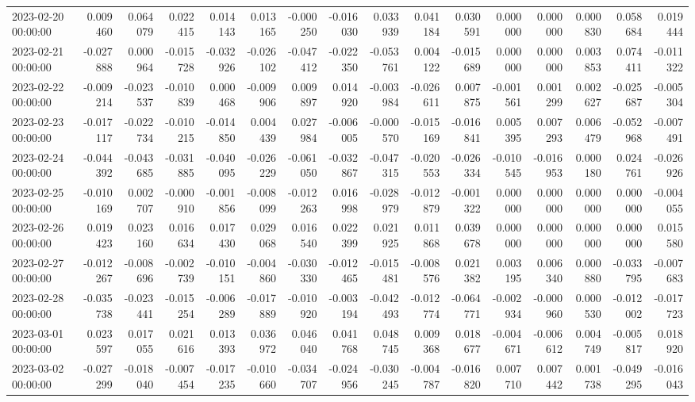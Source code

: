 \begin{tabular}{lrrrrrrrrrrrrrrr}
2023-02-20 00:00:00 & 0.009460 & 0.064079 & 0.022415 & 0.014143 & 0.013165 & -0.000250 & -0.016030 & 0.033939 & 0.041184 & 0.030591 & 0.000000 & 0.000000 & 0.000830 & 0.058684 & 0.019444 \\
2023-02-21 00:00:00 & -0.027888 & 0.000964 & -0.015728 & -0.032926 & -0.026102 & -0.047412 & -0.022350 & -0.053761 & 0.004122 & -0.015689 & 0.000000 & 0.000000 & 0.003853 & 0.074411 & -0.011322 \\
2023-02-22 00:00:00 & -0.009214 & -0.023537 & -0.010839 & 0.000468 & -0.009906 & 0.009897 & 0.014920 & -0.003984 & -0.026611 & 0.007875 & -0.001561 & 0.001299 & 0.002627 & -0.025687 & -0.005304 \\
2023-02-23 00:00:00 & -0.017117 & -0.022734 & -0.010215 & -0.014850 & 0.004439 & 0.027984 & -0.006005 & -0.000570 & -0.015169 & -0.016841 & 0.005395 & 0.007293 & 0.006479 & -0.052968 & -0.007491 \\
2023-02-24 00:00:00 & -0.044392 & -0.043685 & -0.031885 & -0.040095 & -0.026229 & -0.061050 & -0.032867 & -0.047315 & -0.020553 & -0.026334 & -0.010545 & -0.016953 & 0.000180 & 0.024761 & -0.026926 \\
2023-02-25 00:00:00 & -0.010169 & 0.002707 & -0.000910 & -0.001856 & -0.008099 & -0.012263 & 0.016998 & -0.028979 & -0.012879 & -0.001322 & 0.000000 & 0.000000 & 0.000000 & 0.000000 & -0.004055 \\
2023-02-26 00:00:00 & 0.019423 & 0.023160 & 0.016634 & 0.017430 & 0.029068 & 0.016540 & 0.022399 & 0.021925 & 0.011868 & 0.039678 & 0.000000 & 0.000000 & 0.000000 & 0.000000 & 0.015580 \\
2023-02-27 00:00:00 & -0.012267 & -0.008696 & -0.002739 & -0.010151 & -0.004860 & -0.030330 & -0.012465 & -0.015481 & -0.008576 & 0.021382 & 0.003195 & 0.006340 & 0.000880 & -0.033795 & -0.007683 \\
2023-02-28 00:00:00 & -0.035738 & -0.023441 & -0.015254 & -0.006289 & -0.017889 & -0.010920 & -0.003194 & -0.042493 & -0.012774 & -0.064771 & -0.002934 & -0.000960 & 0.000530 & -0.012002 & -0.017723 \\
2023-03-01 00:00:00 & 0.023597 & 0.017055 & 0.021616 & 0.013393 & 0.036972 & 0.046040 & 0.041768 & 0.048745 & 0.009368 & 0.018677 & -0.004671 & -0.006612 & 0.004749 & -0.005817 & 0.018920 \\
2023-03-02 00:00:00 & -0.027299 & -0.018040 & -0.007454 & -0.017235 & -0.010660 & -0.034707 & -0.024956 & -0.030245 & -0.004787 & -0.016820 & 0.007710 & 0.007442 & 0.001738 & -0.049295 & -0.016043 \\

\end{tabular}

